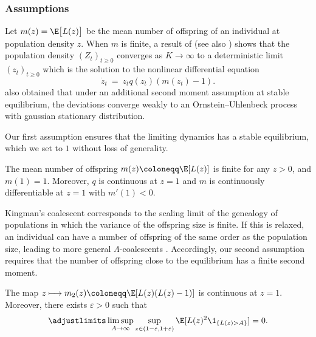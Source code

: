 \begin{refsegment}
\subsubsection*{Assumptions}

Let $m(z) = \E\big[L(z)\big]$ be the mean
number of offspring of an individual at population density $z$. When $m$
is finite, a result of \citet*{Kurtz:1978aa} (see also
\cite[Chapter~11]{ethier_1986}) shows that the population density $(Z_t)_{t \geqslant 0}$ converges as $K \to \infty$ to a deterministic limit
$(z_t)_{t \geqslant 0}$ which is the solution to the nonlinear differential
equation 
\[
    \dot{z}_t \ =\ z_t q(z_t) (m(z_t)-1).
\]
\cite{Kurtz:1978aa} also obtained that under an additional second moment
assumption at stable equilibrium, the deviations converge weakly to an
Ornstein--Uhlenbeck process with gaussian stationary distribution.

Our first assumption ensures that the limiting dynamics has a stable
equilibrium, which we set to $1$ without loss of generality.

\begin{assumption}\label{hyp:equilibrium}
    The mean number of offspring $m(z) \coloneqq \E[L(z)]$ is finite for any $z >
    0$, and $m(1) = 1$. Moreover, $q$ is continuous at $z=1$ and $m$ is
    continuously differentiable at $z=1$ with $m'(1) < 0$.
\end{assumption}

Kingman's coalescent corresponds to the scaling limit of the genealogy of
populations in which the variance of the offspring size is finite. 
If this is relaxed, an individual can have a number of offspring of the
same order as the population size, leading to more general
$\Lambda$-coalescents \citep{schweinsberg2003coalescent, Mohle_Sagitov}.
Accordingly, our second assumption requires that the number of offspring
close to the equilibrium has a finite second moment.

\begin{assumption}\label{hyp:moments} 
    The map $z \longmapsto m_2(z) \coloneqq \E[L(z)(L(z)-1)]$ is
    continuous at $z = 1$. Moreover, there exists $\varepsilon > 0$ such
    that 
    \begin{equation} \label{eq:ch3_UI_moment}
        \adjustlimits\limsup_{A \to \infty}\sup_{z \in (1-\varepsilon, 1+\varepsilon)} 
        \E[L(z)^2 \1_{\{ L(z) > A\}}] = 0.
    \end{equation}
\end{assumption}


\end{refsegment}
